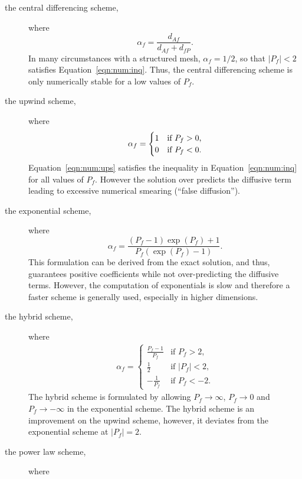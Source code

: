 \begin{description}
%
%
%
\item[the central differencing scheme,] where
\begin{equation}
\alpha_f = \frac{d_{Af}}{d_{Af}+d_{fP}}.
\label{eqn:num:cds}
\end{equation}
In many circumstances with a structured mesh, $\alpha_f=1/2$, so that
$|P_f|<2$ satisfies Equation~\eqref{eqn:num:inq}.  Thus, the central
differencing scheme is only numerically stable for a low values of
$P_f$.
%
%
%
\item[the upwind scheme,] where
\begin{eqnarray}
\alpha_f = \begin{cases}
1 & \text{if $P_f > 0$,} \\
0 & \text{if $ P_f < 0$.}
\end{cases}
\label{eqn:num:ups}
\end{eqnarray}
Equation~\eqref{eqn:num:ups} satisfies the inequality in
Equation~\eqref{eqn:num:inq} for all values of $P_f$.  However the
solution over predicts the diffusive term leading to excessive
numerical smearing (``false diffusion'').
%
%
%
\item[the exponential scheme,] where
\begin{equation}
\alpha_f = \frac{(P_f-1)\exp{(P_f)}+1}{P_f(\exp{(P_f)}-1)}.
\label{eqn:num:exs}
\end{equation}
This formulation can be derived from the exact solution, and thus,
guarantees positive coefficients while not over-predicting the
diffusive terms. However, the computation of exponentials is slow and
therefore a faster scheme is generally used, especially in higher
dimensions.
%
%
%
\item[the hybrid scheme,] where
\begin{eqnarray}
\alpha_f = 
\begin{cases}
    \frac{P_f-1}{P_f} & \text{if $P_f > 2$,} \\
    \frac{1}{2} & \text{if $|P_f| < 2$,} \\
    -\frac{1}{P_f} & \text{if $P_f < -2$.}
\end{cases}
\label{eqn:num:hys}
\end{eqnarray}
The hybrid scheme is formulated by allowing $P_f \rightarrow \infty$,
$P_f \rightarrow 0$ and $P_f \rightarrow -\infty$ in the exponential
scheme.  The hybrid scheme is an improvement on the upwind scheme,
however, it deviates from the exponential scheme at $|P_f|=2$.
%
%
%
\item[the power law scheme,] where

\end{description}
